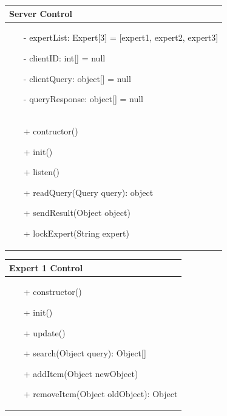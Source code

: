 \documentclass[]{article}
\begin{document}
%
\begin{table}[H]
\centering
\begin{tabular}{|>{\centering\arraybackslash}p{10cm}|}
\hline
Server Control\\
\hline
\begin{itemize}
\item[-] expertList: Expert[3] = [expert1, expert2, expert3]
\item[-] clientID: int[] = null
\item[-] clientQuery: object[] = null
\item[-] queryResponse: object[] = null

\end{itemize}
\\
\hline
\begin{itemize}
\item[+] contructor()
\item[+] init()
\item[+] listen()
\item[+] readQuery(Query query): object
\item[+] sendResult(Object object)
\item[+] lockExpert(String expert)
\end{itemize}
\\
\hline
\end{tabular}
\end{table}
%
\begin{table}[H]
\centering
\begin{tabular}{|>{\centering\arraybackslash}p{10cm}|}
\hline
Expert 1 Control\\
\hline
\begin{itemize}
\item[+] constructor()
\item[+] init()
\item[+] update()
\item[+] search(Object query): Object[]
\item[+] addItem(Object newObject)
\item[+] removeItem(Object oldObject): Object
\end{itemize}
\\
\hline
\end{tabular}
\end{table}
%
\end{document}
